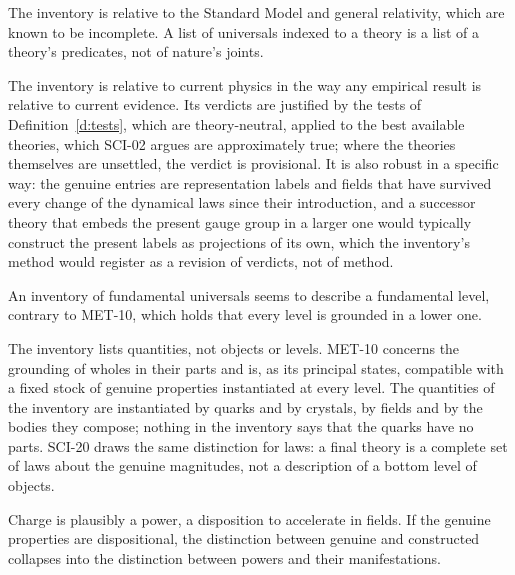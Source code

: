 \documentclass{situationist-preprint}
\begin{document}
\begin{objection}
The inventory is relative to the Standard Model and general relativity, which are known to be incomplete. A list of universals indexed to a theory is a list of a theory's predicates, not of nature's joints.
\end{objection}

\begin{reply}
The inventory is relative to current physics in the way any empirical result is relative to current evidence. Its verdicts are justified by the tests of Definition~\ref{d:tests}, which are theory-neutral, applied to the best available theories, which SCI-02 argues are approximately true; where the theories themselves are unsettled, the verdict is provisional. It is also robust in a specific way: the genuine entries are representation labels and fields that have survived every change of the dynamical laws since their introduction, and a successor theory that embeds the present gauge group in a larger one would typically construct the present labels as projections of its own, which the inventory's method would register as a revision of verdicts, not of method.
\end{reply}

\begin{objection}
An inventory of fundamental universals seems to describe a fundamental level, contrary to MET-10, which holds that every level is grounded in a lower one.
\end{objection}

\begin{reply}
The inventory lists quantities, not objects or levels. MET-10 concerns the grounding of wholes in their parts and is, as its principal states, compatible with a fixed stock of genuine properties instantiated at every level. The quantities of the inventory are instantiated by quarks and by crystals, by fields and by the bodies they compose; nothing in the inventory says that the quarks have no parts. SCI-20 draws the same distinction for laws: a final theory is a complete set of laws about the genuine magnitudes, not a description of a bottom level of objects.
\end{reply}

\begin{objection}[Dispositions]
Charge is plausibly a power, a disposition to accelerate in fields. If the genuine properties are dispositional, the distinction between genuine and constructed collapses into the distinction between powers and their manifestations.
\end{objection}
\end{document}
